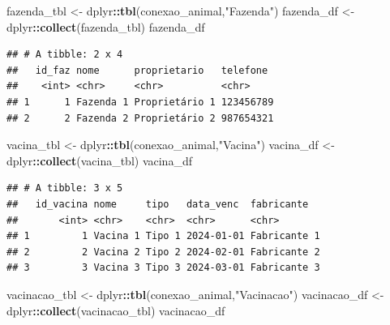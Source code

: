 \documentclass[
]{article}
\newenvironment{Shaded}{\begin{snugshade}}{\end{snugshade}}
\newcommand{\FunctionTok}[1]{\textcolor[rgb]{0.13,0.29,0.53}{\textbf{#1}}}
\newcommand{\NormalTok}[1]{#1}
\newcommand{\OtherTok}[1]{\textcolor[rgb]{0.56,0.35,0.01}{#1}}
\newcommand{\SpecialCharTok}[1]{\textcolor[rgb]{0.81,0.36,0.00}{\textbf{#1}}}
\newcommand{\StringTok}[1]{\textcolor[rgb]{0.31,0.60,0.02}{#1}}
\begin{document}
\begin{Shaded}
\begin{Highlighting}[]
\NormalTok{fazenda\_tbl }\OtherTok{\textless{}{-}}\NormalTok{ dplyr}\SpecialCharTok{::}\FunctionTok{tbl}\NormalTok{(conexao\_animal,}\StringTok{"Fazenda"}\NormalTok{)}
\NormalTok{fazenda\_df }\OtherTok{\textless{}{-}}\NormalTok{ dplyr}\SpecialCharTok{::}\FunctionTok{collect}\NormalTok{(fazenda\_tbl)}
\NormalTok{fazenda\_df}
\end{Highlighting}
\end{Shaded}

\begin{verbatim}
## # A tibble: 2 x 4
##   id_faz nome      proprietario   telefone 
##    <int> <chr>     <chr>          <chr>    
## 1      1 Fazenda 1 Proprietário 1 123456789
## 2      2 Fazenda 2 Proprietário 2 987654321
\end{verbatim}

\begin{Shaded}
\begin{Highlighting}[]
\NormalTok{vacina\_tbl }\OtherTok{\textless{}{-}}\NormalTok{ dplyr}\SpecialCharTok{::}\FunctionTok{tbl}\NormalTok{(conexao\_animal,}\StringTok{"Vacina"}\NormalTok{)}
\NormalTok{vacina\_df }\OtherTok{\textless{}{-}}\NormalTok{ dplyr}\SpecialCharTok{::}\FunctionTok{collect}\NormalTok{(vacina\_tbl)}
\NormalTok{vacina\_df}
\end{Highlighting}
\end{Shaded}

\begin{verbatim}
## # A tibble: 3 x 5
##   id_vacina nome     tipo   data_venc  fabricante  
##       <int> <chr>    <chr>  <chr>      <chr>       
## 1         1 Vacina 1 Tipo 1 2024-01-01 Fabricante 1
## 2         2 Vacina 2 Tipo 2 2024-02-01 Fabricante 2
## 3         3 Vacina 3 Tipo 3 2024-03-01 Fabricante 3
\end{verbatim}

\begin{Shaded}
\begin{Highlighting}[]
\NormalTok{vacinacao\_tbl }\OtherTok{\textless{}{-}}\NormalTok{ dplyr}\SpecialCharTok{::}\FunctionTok{tbl}\NormalTok{(conexao\_animal,}\StringTok{"Vacinacao"}\NormalTok{)}
\NormalTok{vacinacao\_df }\OtherTok{\textless{}{-}}\NormalTok{ dplyr}\SpecialCharTok{::}\FunctionTok{collect}\NormalTok{(vacinacao\_tbl)}
\NormalTok{vacinacao\_df}
\end{Highlighting}
\end{Shaded}
\end{document}
